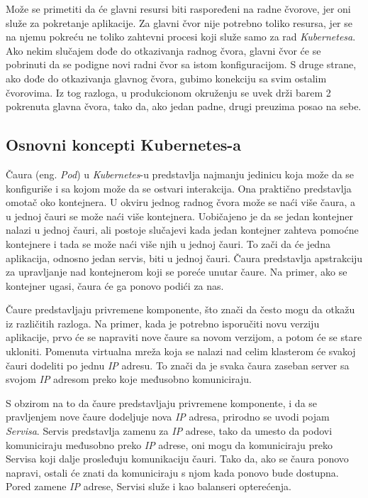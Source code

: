 Može se primetiti da će glavni resursi biti raspoređeni na radne čvorove, jer oni služe za pokretanje 
aplikacije. Za glavni čvor nije potrebno toliko resursa, jer se na njemu pokreću ne toliko zahtevni procesi 
koji služe samo za rad \textit{Kubernetesa}. Ako nekim slučajem dođe do otkazivanja radnog čvora, glavni čvor 
će se pobrinuti da se podigne novi radni čvor sa istom konfiguracijom. S druge strane, ako dođe do 
otkazivanja glavnog čvora, gubimo konekciju sa svim ostalim čvorovima. Iz tog razloga, u produkcionom 
okruženju se uvek drži barem 2 pokrenuta glavna čvora, tako da, ako jedan padne, drugi preuzima 
posao na sebe.

\subsection{Osnovni koncepti Kubernetes-a}
Čaura (eng. {\em Pod}) u \textit{Kubernetes}-u predstavlja najmanju jedinicu koja može da se konfiguriše i sa kojom može da 
se ostvari interakcija. Ona praktično predstavlja omotač oko kontejnera. U okviru jednog radnog čvora 
može se naći više čaura, a u jednoj čauri se može naći više kontejnera. Uobičajeno je da se jedan 
kontejner nalazi u jednoj čauri, ali postoje slučajevi kada jedan kontejner zahteva pomoćne kontejnere 
i tada se može naći više njih u jednoj čauri. To zači da će jedna aplikacija, odnosno jedan servis, 
biti u jednoj čauri. Čaura predstavlja apstrakciju za upravljanje nad kontejnerom koji se poreće unutar
čaure. Na primer, ako se kontejner ugasi, čaura će ga ponovo podići za nas. 

Čaure predstavljaju privremene komponente, što znači da često mogu da otkažu iz različitih razloga. 
Na primer, kada je potrebno isporučiti novu verziju aplikacije, prvo će se napraviti nove čaure sa 
novom verzijom, a potom će se stare ukloniti. Pomenuta virtualna mreža koja se nalazi nad celim 
klasterom će svakoj čauri dodeliti po jednu \textit{IP} adresu. To znači da je svaka čaura zaseban server sa 
svojom \textit{IP} adresom preko koje međusobno komuniciraju.

S obzirom na to da čaure predstavljaju privremene komponente, i da se pravljenjem nove čaure dodeljuje 
nova \textit{IP} adresa, prirodno se uvodi pojam {\em Servisa}. Servis predstavlja zamenu za \textit{IP} adrese, tako 
da umesto da podovi komuniciraju međusobno preko \textit{IP} adrese, oni mogu da komuniciraju preko Servisa 
koji dalje prosleđuju komunikaciju čauri. Tako da, ako se čaura ponovo napravi, ostali će znati da komuniciraju 
s njom kada ponovo bude dostupna. Pored zamene \textit{IP} adrese, Servisi služe i kao balanseri opterećenja. 

